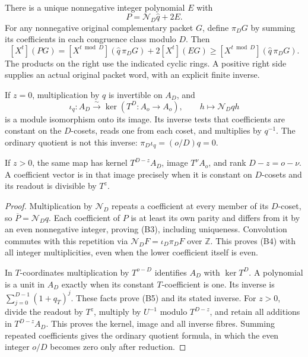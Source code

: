 \begin{theorem}\label{thm:unit}
There is a unique nonnegative integer polynomial $E$ with
\[
 \boxed{P=\mathcal N_D\widehat q+2E.}                       \tag{B3}
\]
For any nonnegative original complementary packet $G$, define $\pi_DG$ by
summing its coefficients in each congruence class modulo $D$. Then
\[
 \boxed{[X^t](PG)
 =[X^{t\bmod D}](\widehat q\,\pi_DG)+2[X^t](EG)
 \ge[X^{t\bmod D}](\widehat q\,\pi_DG).}                  \tag{B4}
\]
The products on the right use the indicated cyclic rings. A positive right
side supplies an actual original packet word, with an explicit finite inverse.

If $z=0$, multiplication by $q$ is invertible on $A_D$, and
\[
 \iota_q:A_D\xrightarrow{\sim}\ker(T^D:A_o\to A_o),\qquad
 h\longmapsto\mathcal N_Dqh                              \tag{B5}
\]
is a module isomorphism onto its image. Its inverse tests that coefficients
are constant on the $D$-cosets, reads one from each coset, and multiplies by
$q^{-1}$. The ordinary quotient is not this inverse:
$\pi_D\iota_q=(o/D)q=0$.

If $z>0$, the same map has kernel $T^{D-z}A_D$, image $T^\nu A_o$, and
rank $D-z=o-\nu$. A coefficient vector is in that image precisely when it is
constant on $D$-cosets and its readout is divisible by $T^z$.
\end{theorem}
\begin{proof}
Multiplication by $\mathcal N_D$ repeats a coefficient at every member of its
$D$-coset, so $\overline P=\mathcal N_Dq$. Each coefficient of $P$ is at least
its own parity and differs from it by an even nonnegative integer, proving
(B3), including uniqueness. Convolution commutes with this repetition via
$\mathcal N_DF=\iota_D\pi_DF$ over $\mathbb Z$. This proves (B4) with all integer
multiplicities, even when the lower coefficient itself is even.

In $T$-coordinates multiplication by $T^{o-D}$ identifies $A_D$ with
$\ker T^D$. A polynomial is a unit in $A_D$ exactly when its constant
$T$-coefficient is one. Its inverse is
$\sum_{j=0}^{D-1}(1+q_T)^j$. These facts prove (B5) and its stated inverse.
For $z>0$, divide the readout by $T^z$, multiply by $U^{-1}$ modulo $T^{D-z}$,
and retain all additions in $T^{D-z}A_D$. This proves the kernel, image and
all inverse fibres. Summing repeated coefficients gives the ordinary quotient
formula, in which the even integer $o/D$ becomes zero only after reduction.
\end{proof}

